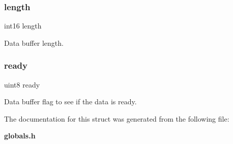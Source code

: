 \subsubsection{length}
{\footnotesize\ttfamily int16 length}

Data buffer length. \mbox{\label{structst__data_ac24f07ab21d61d7af9cb3a49d102e0ac}} 
\subsubsection{ready}
{\footnotesize\ttfamily uint8 ready}

Data buffer flag to see if the data is ready. 

The documentation for this struct was generated from the following file\+:\begin{DoxyCompactItemize}
\item 
\textbf{ globals.\+h}\end{DoxyCompactItemize}
